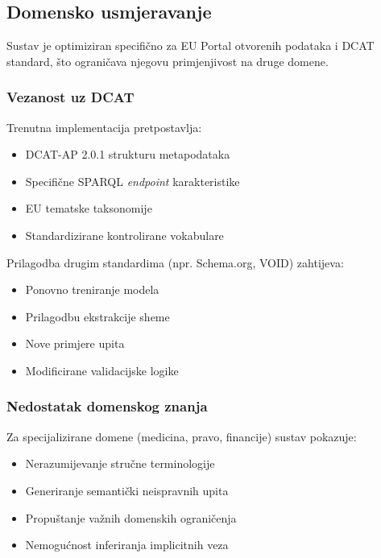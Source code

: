 \subsection{Domensko usmjeravanje}

Sustav je optimiziran specifično za EU Portal otvorenih podataka i DCAT standard, što ograničava njegovu primjenjivost na druge domene.

\subsubsection{Vezanost uz DCAT}

Trenutna implementacija pretpostavlja:

\begin{itemize}
    \item DCAT-AP 2.0.1 strukturu metapodataka
    \item Specifične SPARQL \textit{endpoint} karakteristike
    \item EU tematske taksonomije
    \item Standardizirane kontrolirane vokabulare
\end{itemize}

Prilagodba drugim standardima (npr. Schema.org, VOID) zahtijeva:
\begin{itemize}
    \item Ponovno treniranje modela
    \item Prilagodbu ekstrakcije sheme
    \item Nove primjere upita
    \item Modificirane validacijske logike
\end{itemize}

\subsubsection{Nedostatak domenskog znanja}

Za specijalizirane domene (medicina, pravo, financije) sustav pokazuje:

\begin{itemize}
    \item Nerazumijevanje stručne terminologije
    \item Generiranje semantički neispravnih upita
    \item Propuštanje važnih domenskih ograničenja
    \item Nemogućnost inferiranja implicitnih veza
\end{itemize}

